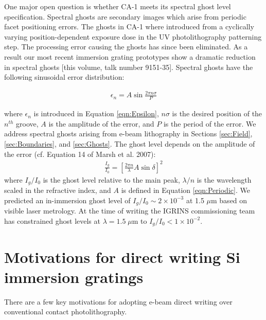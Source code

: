 \documentclass[]{spie}  %
\begin{document}
One major open question is whether CA-1 meets its spectral ghost level specification.  Spectral ghosts are secondary images which arise from periodic facet positioning errors\cite{2007sdf..book.....J}. The ghosts in CA-1 where introduced from a cyclically varying position-dependent exposure dose in the UV photolithography patterning step.  The processing error causing the ghosts has since been eliminated.  As a result our most recent immersion grating prototypes show a dramatic reduction in spectral ghosts [this volume, talk number 9151-35]\cite{2014SPIE.BROOKS.GRATINGS}.  Spectral ghosts have the following sinusoidal error distribution:

\begin{eqnarray}
	\epsilon_n = A\sin{\frac{2\pi n\sigma}{P}} \label{eqn:Periodic}
\end{eqnarray}

where $\epsilon_n$ is introduced in Equation \ref{eqn:Epsilon}, $n\sigma$ is the desired position of the $n^{th}$ groove, $A$ is the amplitude of the error, and $P$ is the period of the error.  We address spectral ghosts arising from e-beam lithography in Sections \ref{sec:Field}, \ref{sec:Boundaries}, and  \ref{sec:Ghosts}.  The ghost level depends on the amplitude of the error (cf. Equation 14 of Marsh et al. 2007\cite{2007ApOpt..46.3400M}):
\begin{eqnarray}
	\frac{I_g}{I_0}=[ \frac{2\pi n}{\lambda}A \sin{\delta} ]^2	 \label{eqn:GLevel}
\end{eqnarray}
where $I_g/I_0$ is the ghost level relative to the main peak, $\lambda/n$ is the wavelength scaled in the refractive index, and $A$ is defined in Equation \ref{eqn:Periodic}.  We predicted an in-immersion ghost level of $I_g/I_0 \sim2\times10^{-3}$ at 1.5 $\mu$m based on visible laser metrology\cite{2012SPIE.8450E..2SG}.  At the time of writing the IGRINS commissioning team has constrained ghost levels at $\lambda=1.5 \; \mu$m to $I_g/I_0 < 1\times10^{-2}$.


\section{Motivations for direct writing Si immersion gratings}
There are a few key motivations for adopting e-beam direct writing over conventional contact photolithography.  
\end{document}

